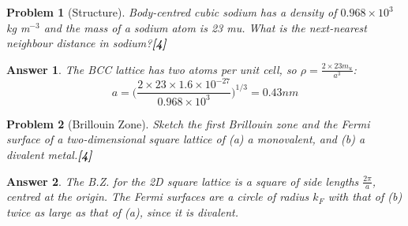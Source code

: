 \documentclass[a4paper]{article}
\newtheorem{ans}{Answer}[subsection]
\theoremstyle{new}
\newtheorem{qns}{Problem}[subsection]
\begin{document}
\begin{qns}[Structure]
Body-centred cubic sodium has a density of $0.968\times10^3$ kg m$^{−3}$ and the mass of a sodium atom is 23 mu. What is the next-nearest neighbour distance in sodium?\hfill\textbf{[4]}
\end{qns}
\begin{ans}
The BCC lattice has two atoms per unit cell, so $\rho=\frac{2\times 23 m_u}{a^3}$:
$$a=\bigg(\frac{2\times 23\times 1.6\times10^{-27}}{0.968\times10^3}\bigg)^{1/3}=0.43 nm$$
\end{ans}
\begin{qns}[Brillouin Zone]
Sketch the first Brillouin zone and the Fermi surface of a two-dimensional square lattice of (a) a monovalent, and (b) a divalent metal.\hfill\textbf{[4]}
\end{qns}
\begin{ans}
The B.Z. for the 2D square lattice is a square of side lengths $\frac{2\pi}{a}$, centred at the origin. The Fermi surfaces are a circle of radius $k_F$ with that of (b) twice as large as that of (a), since it is divalent.
\begin{center}
\hspace{2cm}
\end{center}
\end{ans}
\newpage
\end{document}
